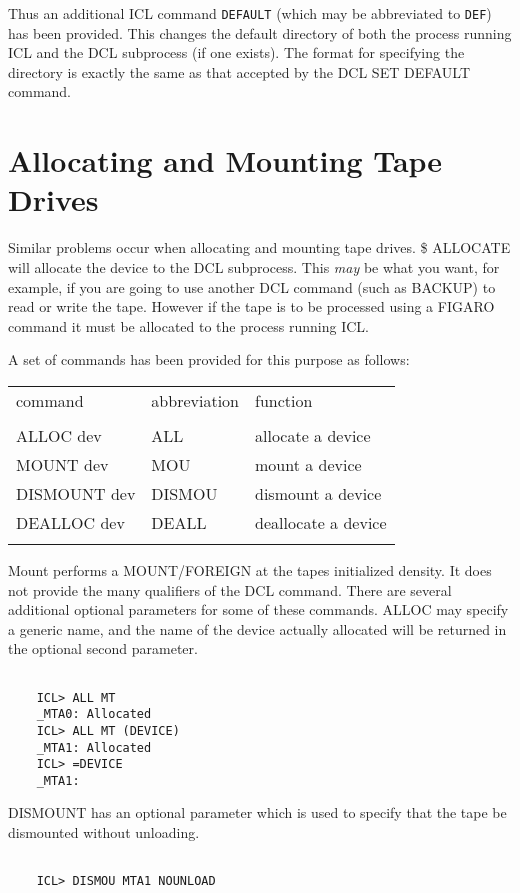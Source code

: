 \documentclass[twoside,11pt]{report}
\newcommand{\xlabel}[1]{}
\begin{document}
Thus an additional ICL command \verb+DEFAULT+ (which may be abbreviated
to \verb+DEF+) has been provided. This changes the default directory of
both the process running ICL and the DCL subprocess (if one exists). The
format for specifying the directory is exactly the same as that accepted
by the DCL SET DEFAULT command.

\section{\xlabel{allocating_and_mounting_tape_drives}Allocating and Mounting Tape Drives}
Similar problems occur when allocating and mounting tape drives. 
\$ ALLOCATE will allocate the device to the DCL subprocess. This {\em may}
be what you want, for example, if you are going to use another DCL
command (such as BACKUP) to read or write the tape. However if the tape
is to be processed using a FIGARO command it must be allocated to the
process running ICL.

A set of commands has been provided for this purpose as follows:

\begin{center}
\begin{tabular}{lll}
\\
command & abbreviation & function\\
\\
ALLOC dev & ALL & allocate a device\\
MOUNT dev & MOU & mount a device\\
DISMOUNT dev & DISMOU & dismount a device\\
DEALLOC dev & DEALL & deallocate a device\\
\\
\end{tabular}
\end{center}
Mount performs a MOUNT/FOREIGN at the tapes initialized density. It does
not provide the many qualifiers of the DCL command. There are several
additional optional parameters for some of these commands. ALLOC may
specify a generic name, and the name of the device actually allocated
will be returned in the optional second parameter.
\begin{verbatim}

    ICL> ALL MT
    _MTA0: Allocated
    ICL> ALL MT (DEVICE)
    _MTA1: Allocated
    ICL> =DEVICE
    _MTA1:

\end{verbatim}
DISMOUNT has an optional parameter which is used to specify that the
tape be dismounted without unloading.
\begin{verbatim}

    ICL> DISMOU MTA1 NOUNLOAD

\end{verbatim}
\end{document}
